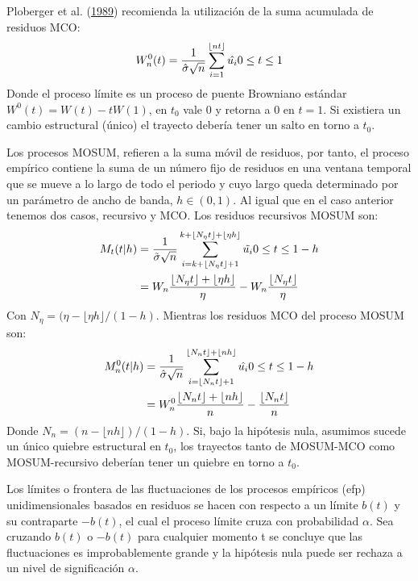 \documentclass[12pt,oneside]{reedthesis}
\begin{document}
Ploberger et al. (\protect\hyperlink{ref-Ploberger1989}{1989}) recomienda la utilización de la suma acumulada de residuos MCO:
\begin{equation}
W_n^0(t) = \frac{1}{\hat{\sigma}\sqrt n}\sum_{i=1}^{\lfloor nt\rfloor}\hat{u_i}\space\space\space\space\space 0 \leq t \leq 1
\end{equation}
Donde el proceso límite es un proceso de puente Browniano estándar \(W^0(t) = W(t) - tW(1)\), en \(t_0\) vale 0 y retorna a 0 en \(t = 1\). Si existiera un cambio estructural (único) el trayecto debería tener un salto en torno a \(t_0\).

Los procesos MOSUM, refieren a la suma móvil de residuos, por tanto, el proceso empírico contiene la suma de un número fijo de residuos en una ventana temporal que se mueve a lo largo de todo el periodo y cuyo largo queda determinado por un parámetro de ancho de banda, \(h \in(0,1)\). Al igual que en el caso anterior tenemos dos casos, recursivo y MCO. Los residuos recursivos MOSUM son:
\begin{align}
M_t(t|h) &= \frac{1}{\tilde\sigma\sqrt n}\sum_{i=k+\lfloor N_{\eta}t\rfloor + 1}^{k + \lfloor N_{\eta}t\rfloor + \lfloor \eta h\rfloor}\tilde{u_i} \space\space\space\space\space 0\leq t\leq1-h \\
&= W_n\frac{\lfloor N_{\eta}t\rfloor+\lfloor\eta h\rfloor}{\eta}-W_n\frac{\lfloor N_{\eta}t\rfloor}{\eta}
\end{align}
Con \(N_{\eta} = (\eta - \lfloor\eta h\rfloor/(1-h)\). Mientras los residuos MCO del proceso MOSUM son:
\begin{align}
M_n^0(t|h) &= \frac{1}{\hat{\sigma}\sqrt n}\sum_{i=\lfloor N_{n}t\rfloor + 1}^{\lfloor N_{n}t \rfloor + \lfloor nh\rfloor}\hat{u_i} \space\space\space\space\space\space 0 \leq t \leq 1-h \\
&= W_n^0\frac{\lfloor N_nt\rfloor + \lfloor nh \rfloor}{n} - \frac{\lfloor N_nt\rfloor}{n}
\end{align}
Donde \(N_n = (n - \lfloor nh\rfloor)/(1-h)\). Si, bajo la hipótesis nula, asumimos sucede un único quiebre estructural en \(t_0\), los trayectos tanto de MOSUM-MCO como MOSUM-recursivo deberían tener un quiebre en torno a \(t_0\).

Los límites o frontera de las fluctuaciones de los procesos empíricos (efp) unidimensionales basados en residuos se hacen con respecto a un límite \(b(t)\) y su contraparte \(-b(t)\), el cual el proceso límite cruza con probabilidad \(\alpha\). Sea cruzando \(b(t)\) o \(-b(t)\) para cualquier momento t se concluye que las fluctuaciones es improbablemente grande y la hipótesis nula puede ser rechaza a un nivel de significación \(\alpha\).
\end{document}
